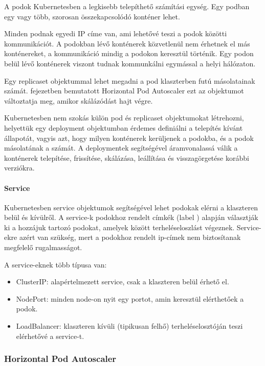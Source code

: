 \documentclass[a4paper,oneside]{article}
\begin{document}
A podok \cite{kubernetes-pods} Kubernetesben a legkisebb telepíthető számítási
egység. Egy podban egy vagy több, szorosan összekapcsolódó konténer lehet.

Minden podnak egyedi IP címe van, ami lehetővé teszi a podok közötti
kommunikációt. A podokban lévő konténerek közvetlenül nem érhetnek
el más konténereket, a kommunikáció mindig a podokon keresztül történik. Egy
podon belül lévő konténerek viszont tudnak kommunkálni egymással a helyi
hálózaton.

Egy replicaset \cite{kubernetes-replicaset} objektummal lehet megadni a pod
klaszterben futú másolatainak számát.  fejezetben bemutatott
Horizontal Pod Autoscaler ezt az objektumot változtatja meg, amikor skálázódást
hajt végre.

Kubernetesben nem szokás külön pod és replicaset objektumokat létrehozni,
helyettük egy deployment \cite{kubernetes-deployment} objektumban érdemes
definiálni a telepítés kívánt állapotát, vagyis azt, hogy milyen konténerek
kerüljenek a podokba, és a podok másolatának a számát. A deploymentek
segítségével áramvonalassá válik a konténerek telepítése, frissítése, skálázása,
leállítása és visszagörgetése korábbi verziókra.

\paragraph{Service}

Kubernetesben service \cite{kubernetes-service} objektumok segítségével lehet
podokak elérni a klaszteren belül és kívülről.  A service-k podokhoz rendelt
címkék (label \cite{kubernetes-labels}) alapján választják ki a hozzájuk tartozó
podokat, amelyek között terheléseloszlást végeznek. Service-ekre azért van
szükség, mert a podokhoz rendelt ip-címek nem biztosítanak megfelelő
rugalmasságot.

A service-eknek több típusa van:

\begin{itemize}
  \item ClusterIP: alapértelmezett service, csak a klaszteren belül érhető el.
  \item NodePort: minden node-on nyit egy portot, amin keresztül elérthetőek a
  podok.
  \item LoadBalancer: klaszteren kívüli (tipikusan felhő) terheléselosztóján
  teszi elérhetővé a service-t.
\end{itemize}


\subsubsection{Horizontal Pod Autoscaler}
\label{secsec:hpa}
\end{document}
